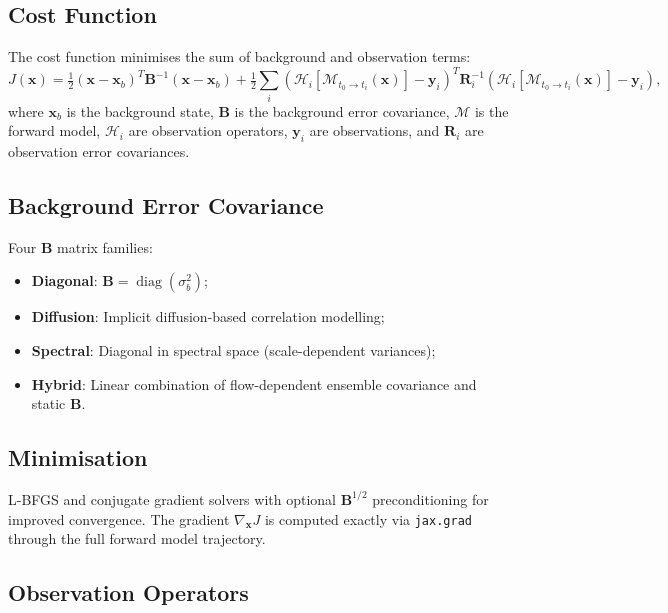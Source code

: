 \documentclass[11pt,twoside]{report}
\newcommand{\half}{\tfrac{1}{2}}
\newcommand{\vect}[1]{\bm{#1}}
\newcommand{\grad}{\nabla}
\DeclareMathOperator{\diag}{diag}
\begin{document}
\subsection{Cost Function}

The cost function minimises the sum of background and observation terms:
\begin{equation}
  J(\vect{x}) = \half(\vect{x}-\vect{x}_b)^T\mathbf{B}^{-1}(\vect{x}-\vect{x}_b)
  + \half\sum_i (\mathcal{H}_i[\mathcal{M}_{t_0\to t_i}(\vect{x})]-\vect{y}_i)^T
  \mathbf{R}_i^{-1}(\mathcal{H}_i[\mathcal{M}_{t_0\to t_i}(\vect{x})]-\vect{y}_i),
\end{equation}
where $\vect{x}_b$ is the background state, $\mathbf{B}$ is the background
error covariance, $\mathcal{M}$ is the forward model, $\mathcal{H}_i$ are
observation operators, $\vect{y}_i$ are observations, and $\mathbf{R}_i$
are observation error covariances.

\subsection{Background Error Covariance}

Four $\mathbf{B}$ matrix families:
\begin{itemize}[nosep]
  \item \textbf{Diagonal}: $\mathbf{B}=\diag(\sigma_b^2)$;
  \item \textbf{Diffusion}: Implicit diffusion-based correlation modelling;
  \item \textbf{Spectral}: Diagonal in spectral space (scale-dependent variances);
  \item \textbf{Hybrid}: Linear combination of flow-dependent ensemble
    covariance and static $\mathbf{B}$.
\end{itemize}

\subsection{Minimisation}

L-BFGS and conjugate gradient solvers with optional
$\mathbf{B}^{1/2}$ preconditioning for improved convergence.
The gradient $\grad_{\vect{x}}J$ is computed exactly via
\texttt{jax.grad} through the full forward model trajectory.

\subsection{Observation Operators}
\end{document}

